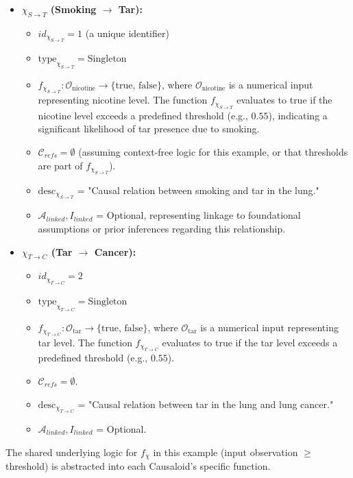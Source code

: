         \begin{itemize}
            \item \textbf{\(\chi_{S \to T}\) (Smoking \(\rightarrow\) Tar):}
                \begin{itemize}
                    \item \(id_{\chi_{S \to T}} = 1\) (a unique identifier)
                    \item \(\text{type}_{\chi_{S \to T}} = \text{Singleton}\)
                    \item \(f_{\chi_{S \to T}}: \mathcal{O}_{\text{nicotine}} \to \{\text{true, false}\}\), where \(\mathcal{O}_{\text{nicotine}}\) is a numerical input representing nicotine level. The function \(f_{\chi_{S \to T}}\) evaluates to true if the nicotine level exceeds a predefined threshold (e.g., \(0.55\)), indicating a significant likelihood of tar presence due to smoking.
                    \item \(\mathcal{C}_{refs} = \emptyset\) (assuming context-free logic for this example, or that thresholds are part of \(f_{\chi_{S \to T}}\)).
                    \item \(\text{desc}_{\chi_{S \to T}}\) = "Causal relation between smoking and tar in the lung."
                    \item \(\mathcal{A}_{linked}, I_{linked}\) = Optional, representing linkage to foundational assumptions or prior inferences regarding this relationship.
                \end{itemize}
            \vspace{0.5em} 
            \item \textbf{\(\chi_{T \to C}\) (Tar \(\rightarrow\) Cancer):}
                \begin{itemize}
                    \item \(id_{\chi_{T \to C}} = 2\)
                    \item \(\text{type}_{\chi_{T \to C}} = \text{Singleton}\)
                    \item \(f_{\chi_{T \to C}}: \mathcal{O}_{\text{tar}} \to \{\text{true, false}\}\), where \(\mathcal{O}_{\text{tar}}\) is a numerical input representing tar level. The function \(f_{\chi_{T \to C}}\) evaluates to true if the tar level exceeds a predefined threshold (e.g., \(0.55\)).
                    \item \(\mathcal{C}_{refs} = \emptyset\).
                    \item \(\text{desc}_{\chi_{T \to C}}\) = "Causal relation between tar in the lung and lung cancer."
                    \item \(\mathcal{A}_{linked}, I_{linked}\) = Optional.
                \end{itemize}
        \end{itemize}
        The shared underlying logic for \(f_\chi\) in this example (input observation \(\ge\) threshold) is abstracted into each Causaloid's specific function.

